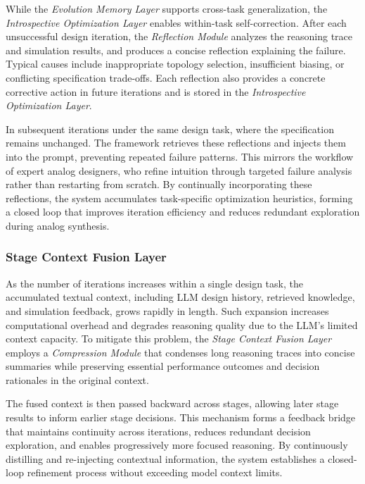 While the \emph{Evolution Memory Layer} supports cross-task generalization, the \emph{Introspective Optimization Layer} enables within-task self-correction. After each unsuccessful design iteration, the \emph{Reflection Module} analyzes the reasoning trace and simulation results, and produces a concise reflection explaining the failure. Typical causes include inappropriate topology selection, insufficient biasing, or conflicting specification trade-offs. Each reflection also provides a concrete corrective action in future iterations and is stored in the \emph{Introspective Optimization Layer}.

In subsequent iterations under the same design task, where the specification remains unchanged. The framework retrieves these reflections and injects them into the prompt, preventing repeated failure patterns. This mirrors the workflow of expert analog designers, who refine intuition through targeted failure analysis rather than restarting from scratch. By continually incorporating these reflections, the system accumulates task-specific optimization heuristics, forming a closed loop that improves iteration efficiency and reduces redundant exploration during analog synthesis.




\subsubsection{Stage Context Fusion Layer}


As the number of iterations increases within a single design task, the accumulated textual context, including LLM design history, retrieved knowledge, and simulation feedback, grows rapidly in length. Such expansion increases computational overhead and degrades reasoning quality due to the LLM’s limited context capacity. To mitigate this problem, the \emph{Stage Context Fusion Layer} employs a \emph{Compression Module} that condenses long reasoning traces into concise summaries while preserving essential performance outcomes and decision rationales in the original context.

The fused context is then passed backward across stages, allowing later stage results to inform earlier stage decisions. This mechanism forms a feedback bridge that maintains continuity across iterations, reduces redundant decision exploration, and enables progressively more focused reasoning. By continuously distilling and re-injecting contextual information, the system establishes a closed-loop refinement process without exceeding model context limits.


